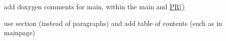 
\begin{DoxyRefList}
\item[\label{todo__todo000002}%
\hypertarget{todo__todo000002}{}%
Member \hyperlink{CImg_8display_8cpp_a3c04138a5bfe5d72780bb7e82a18e627}{main} (int argc, char $\ast$$\ast$argv)]add doxygen comments for main, within the main and \hyperlink{CImg_8display_8cpp_aea1ac050c1347d4a67f85cbfc88ec8cf}{P\-R()}  
\item[\label{todo__todo000001}%
\hypertarget{todo__todo000001}{}%
Page \hyperlink{user}{user guide} ]use section (instead of paragraphs) and add table of contents (such as in mainpage)
\end{DoxyRefList}